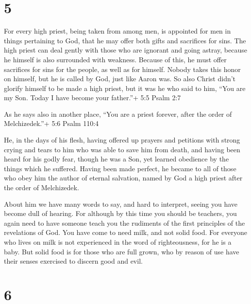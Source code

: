 \hypertarget{section-4}{%
\section{5}\label{section-4}}

 For every high priest, being taken from among men, is
appointed for men in things pertaining to God, that he may offer both
gifts and sacrifices for sins.  The high priest can deal
gently with those who are ignorant and going astray, because he himself
is also surrounded with weakness.  Because of this, he must
offer sacrifices for sins for the people, as well as for himself.
 Nobody takes this honor on himself, but he is called by
God, just like Aaron was.  So also Christ didn't glorify
himself to be made a high priest, but it was he who said to him, ``You
are my Son. Today I have become your father.''+ 5:5 Psalm 2:7

 As he says also in another place, ``You are a priest
forever, after the order of Melchizedek.''+ 5:6 Psalm 110:4

 He, in the days of his flesh, having offered up prayers and
petitions with strong crying and tears to him who was able to save him
from death, and having been heard for his godly fear, 
though he was a Son, yet learned obedience by the things which he
suffered.  Having been made perfect, he became to all of
those who obey him the author of eternal salvation,  named
by God a high priest after the order of Melchizedek.

 About him we have many words to say, and hard to
interpret, seeing you have become dull of hearing.  For
although by this time you should be teachers, you again need to have
someone teach you the rudiments of the first principles of the
revelations of God. You have come to need milk, and not solid food.
 For everyone who lives on milk is not experienced in the
word of righteousness, for he is a baby.  But solid food is
for those who are full grown, who by reason of use have their senses
exercised to discern good and evil.

\hypertarget{section-5}{%
\section{6}\label{section-5}}

